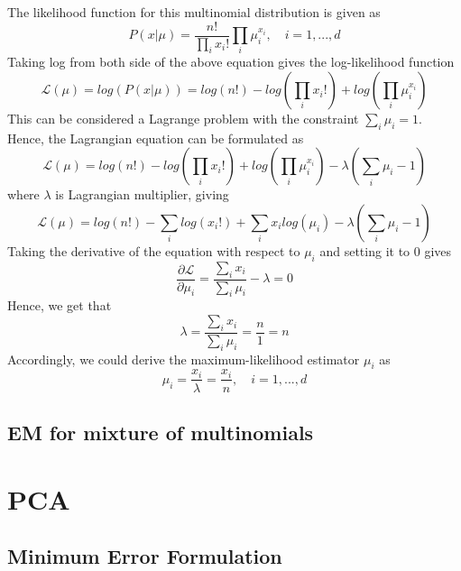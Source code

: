 \documentclass[12pt,a4paper]{article}
\begin{document}
	\noindent The likelihood function for this multinomial distribution is given as
	\begin{equation}
		P(x|\mu) = \frac{n!}{\prod_{i}x_i!}\prod_{i}\mu^{x_i}_i,\quad i=1, ..., d
	\end{equation}
	Taking log from both side of the above equation gives the log-likelihood function
	\begin{equation}
		\mathcal{L}(\mu) = log(P(x|\mu)) = log(n!)- log(\prod_{i}x_i!) +log(\prod_{i}\mu^{x_i}_i)
	\end{equation}
	This can be considered a Lagrange problem with the constraint $\sum_{i}\mu_i=1$. Hence, the Lagrangian equation can be formulated as
	\begin{equation}
		\mathcal{L}(\mu) = log(n!)- log(\prod_{i}x_i!) +log(\prod_{i}\mu^{x_i}_i) - \lambda(\sum_{i}\mu_i-1)
	\end{equation}
where $\lambda$ is Lagrangian multiplier, giving
\begin{equation}
	\mathcal{L}(\mu) = log(n!)- \sum_{i}log(x_i!) + \sum_{i}{x_i}log(\mu_i) - \lambda(\sum_{i}\mu_i-1)
\end{equation}
	Taking the derivative of the equation with respect to $\mu_i$ and setting it to 0 gives
	\begin{equation}
		\frac{\partial \mathcal{L}}{\partial \mu_i}= \frac{\sum_{i}x_i}{\sum_{i}\mu_i} - \lambda = 0
	\end{equation}
	Hence, we get that
	\begin{equation}
		 \lambda= \frac{\sum_{i}x_i}{\sum_{i}\mu_i} = \frac{n}{1} = n
	\end{equation}
	Accordingly, we could derive the maximum-likelihood estimator $\mu_i$ as
	\begin{equation}
		\mu_i= \frac{x_i}{\lambda} = \frac{x_i}{n},\quad i=1, ..., d
	\end{equation}


	\subsection{EM for mixture of multinomials}
	
	\section{PCA}
	\subsection{Minimum Error Formulation}
	
\end{document}
